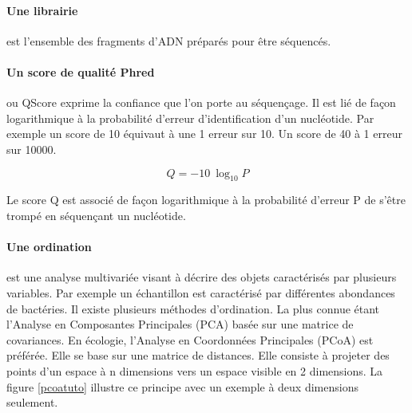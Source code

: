 \documentclass[12pt,a4paper]{article}
\begin{document}
\paragraph{Une librairie} est l'ensemble des fragments d'ADN préparés pour être séquencés.

\paragraph{Un score de qualité Phred} ou QScore exprime la confiance que l'on porte au séquençage. Il est lié de façon logarithmique à la probabilité d'erreur d'identification d'un nucléotide.  Par exemple un score de 10 équivaut à une 1 erreur sur 10. Un score de 40 à 1 erreur sur 10000.


\begin{mycapequ}[!h]
   \begin{equation}
    Q = -10 \ \log_{10} P
   \end{equation}
      \caption{Le score Q est associé de façon logarithmique à la probabilité d'erreur P de s'être trompé en séquençant un nucléotide.}
\end{mycapequ}




\paragraph{Une ordination} est une analyse multivariée visant à décrire des objets caractérisés par plusieurs variables. Par exemple un échantillon est caractérisé par différentes abondances de bactéries. Il existe plusieurs méthodes d'ordination. La plus connue étant l'Analyse en Composantes Principales (PCA) basée sur une matrice de covariances. En écologie, l'Analyse en Coordonnées Principales (PCoA) est préférée. Elle se base sur une matrice de distances. Elle consiste à projeter des points d'un espace à n dimensions vers un espace visible en 2 dimensions.
La figure \ref{pcoatuto} illustre ce principe avec un exemple à deux dimensions seulement.
\end{document}
